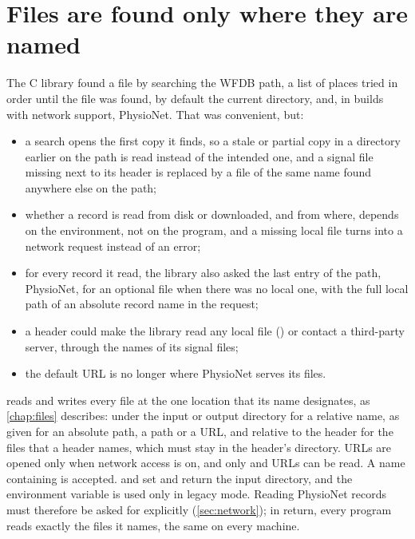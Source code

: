 \section{Files are found only where they are named}
\label{sec:named-files}

The C library found a file by searching the WFDB path, a list of places
tried in order until the file was found, by default the current directory,
 and, in builds with network support, PhysioNet.
That was convenient, but:
\begin{itemize}
\item a search opens the first copy it finds, so a stale or partial copy in
  a directory earlier on the path is read instead of the intended one, and
  a signal file missing next to its header is replaced by a file of the same
  name found anywhere else on the path;
\item whether a record is read from disk or downloaded, and from where,
  depends on the environment, not on the program, and a missing local file
  turns into a network request instead of an error;
\item for every record it read, the library also asked the last entry of the
  path, PhysioNet, for an optional  file when there was no local
  one, with the full local path of an absolute record name in the request;
\item a header could make the library read any local file
  () or contact a third-party server, through the
  names of its signal files;
\item the default URL is no longer where PhysioNet serves its files.
\end{itemize}
\wfdbx{} reads and writes every file at the one location that its name
designates, as \cref{chap:files} describes: under the input or output
directory for a relative name, as given for an absolute path, a
\code{\textasciitilde} path or a URL, and relative to the header for the
files that a header names, which must stay in the header's directory. URLs
are opened only when network access is on, and only  and
 URLs can be read. A name containing  is
accepted.  and  set and return the input
directory, and the  environment variable is used only in legacy
mode. Reading PhysioNet records must therefore be asked for explicitly
(\cref{sec:network}); in return, every program reads exactly the files it
names, the same on every machine.

